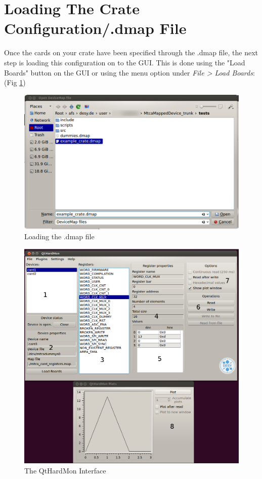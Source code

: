 \section{Loading The Crate Configuration/.dmap File} 

Once the cards on your
crate have been specified through the .dmap file, the next step is loading this
configuration on to the GUI. This is done using the "Load Boards" button on the
GUI or using the menu option under \textit{File > Load Boards}: 
(Fig \ref{load_boards_open_menu_to_load_dmap})

\begin{figure}[htbp] 
    \centering
    \includegraphics[width=1\textwidth]{images/load_boards_2.png}
    \caption{Loading the .dmap file} \label{load_boards_open_menu_to_load_dmap}
\end{figure}

\begin{figure}[htbp] 
    \centering
    \includegraphics[width=1\textwidth]{images/explain_windows.png} \caption{The
    QtHardMon Interface} \label{qthardmon_interface} \end{figure}

